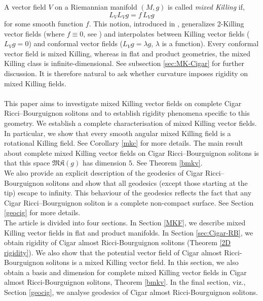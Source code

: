 \documentclass{article}
\theoremstyle{definition}
\theoremstyle{remark}
\begin{document}
\indent
A vector field $V$ on a Riemannian manifold $(M,g)$ is called 
\emph{mixed Killing} if,
\[
L_V L_V g = f\, L_V g
\]
for some smooth function $f$. 
This notion, introduced in \cite{ghosh2025mixed}, generalizes 
2-Killing vector fields (where $f \equiv 0$, see \cite{Oprea2008}) 
and interpolates between Killing vector fields ($L_V g = 0$) and 
conformal vector fields   ($L_V g = \lambda g$, $\lambda$ is a function). 
Every conformal vector field is mixed Killing, whereas in flat 
and product geometries, the mixed Killing class is infinite-dimensional. See subsection 
\ref{sec:MK-Cigar} for further discussion.
It is therefore natural to ask whether curvature imposes rigidity on mixed Killing fields.\\\\
\indent
This paper aims to investigate mixed Killing vector fields 
on complete Cigar Ricci--Bourguignon solitons and to establish 
rigidity phenomena specific to this geometry. We establish a 
complete characterisation of mixed Killing vector fields. 
In particular, we show that every smooth angular mixed Killing 
field is a rotational Killing field. See Corollary \ref{mkc} for more details. The main result about complete mixed Killing vector fields on Cigar Ricci--Bourguignon solitons is that this space
$\mathfrak{MK}(g)$ has dimension $5$. See Theorem \ref{bmkv}. \\

We also provide an explicit description of the geodesics of 
Cigar Ricci--Bourguignon solitons and show that
all geodesics (except those starting at 
the tip) escape to infinity. This behaviour of the geodesics 
reflects the fact that any Cigar Ricci--Bourguignon soliton
is a complete non-compact surface. See  Section \ref{geocig} for more details.\\
 
 The article is divided into four sections.  In Section \ref{MKF}, 
we describe mixed Killing vector fields in flat and product manifolds.  
In Section \ref{sec:Cigar-RB}, we obtain rigidity of Cigar 
almost Ricci-Bourguignon solitons  (Theorem \ref{2D rigidity}). We also
show that the potential vector field of  Cigar almost Ricci-Bourguignon solitons
is a mixed Killing vector field.  In this section, we also obtain a basis and dimension for complete mixed Killing vector fields in Cigar almost Ricci-Bourguignon solitons, Theorem \ref{bmkv}.
In the final section, viz., Section \ref{geocig}, we analyse geodesics of Cigar almost Ricci-Bourguignon solitons.   

\end{document}
